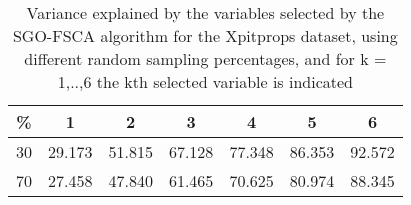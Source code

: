 \begin{table}
	\begin{center}
		\begin{tabular}{c c c c c c c}
			\% & 1 & 2 & 3 & 4 & 5 & 6 \\
			\hline
			30 & 29.173 & 51.815 & 67.128 & 77.348 & 86.353 & 92.572 \\
			70 & 27.458 & 47.840 & 61.465 & 70.625 & 80.974 & 88.345 \\
		\end{tabular}
	\end{center}
	\caption{Variance explained by the variables selected by the SGO-FSCA algorithm for the Xpitprops dataset, using different random sampling percentages, and for k = 1,..,6 the kth selected variable is indicated}
\end{table}